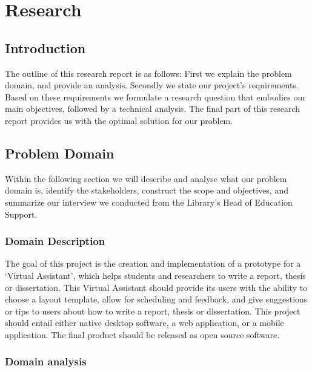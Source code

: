 \chapter{Research}

\section{Introduction}

The outline of this research report is as follows: First we explain the problem domain, and provide an analysis. Secondly we state our project's requirements. Based on these requirements we formulate a research question that embodies our main objectives, followed by a technical analysis. The final part of this research report provides us with the optimal solution for our problem.


\section{Problem Domain} %
\label{sec:problem_domain}


Within the following section we will describe and analyse what our problem domain is, identify the stakeholders, construct the scope and objectives, and summarize our interview we conducted from the Library's Head of Education Support.

\subsection{Domain Description} %
\label{sub:problem_description}

The goal of this project is the creation and implementation of a prototype for a `Virtual Assistant', which helps students and researchers to write a report, thesis or dissertation. This Virtual Assistant should provide its users with the ability to choose a layout template, allow for scheduling and feedback, and give suggestions or tips to users about how to write a report, thesis or dissertation.
This project should entail either native desktop software, a web application, or a mobile application. The final product should be released as open source software.

\subsection{Domain analysis} %

